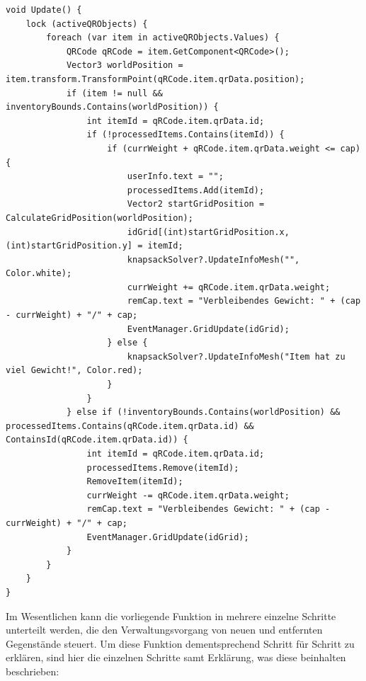 \begin{lstlisting}[style=csharp, caption={Neue / Entfernte Items erkennen}, label=code:controller_updateGrid]
void Update() {
    lock (activeQRObjects) {
        foreach (var item in activeQRObjects.Values) {
            QRCode qRCode = item.GetComponent<QRCode>();
            Vector3 worldPosition = item.transform.TransformPoint(qRCode.item.qrData.position);
            if (item != null && inventoryBounds.Contains(worldPosition)) {
                int itemId = qRCode.item.qrData.id;
                if (!processedItems.Contains(itemId)) {
                    if (currWeight + qRCode.item.qrData.weight <= cap) {
                        userInfo.text = "";
                        processedItems.Add(itemId);
                        Vector2 startGridPosition = CalculateGridPosition(worldPosition);
                        idGrid[(int)startGridPosition.x, (int)startGridPosition.y] = itemId;
                        knapsackSolver?.UpdateInfoMesh("", Color.white);
                        currWeight += qRCode.item.qrData.weight;
                        remCap.text = "Verbleibendes Gewicht: " + (cap - currWeight) + "/" + cap;
                        EventManager.GridUpdate(idGrid);
                    } else {
                        knapsackSolver?.UpdateInfoMesh("Item hat zu viel Gewicht!", Color.red);
                    }
                }
            } else if (!inventoryBounds.Contains(worldPosition) && processedItems.Contains(qRCode.item.qrData.id) && ContainsId(qRCode.item.qrData.id)) {
                int itemId = qRCode.item.qrData.id;
                processedItems.Remove(itemId);
                RemoveItem(itemId);
                currWeight -= qRCode.item.qrData.weight;
                remCap.text = "Verbleibendes Gewicht: " + (cap - currWeight) + "/" + cap;
                EventManager.GridUpdate(idGrid);
            }
        }
    }
}
\end{lstlisting}
Im Wesentlichen kann die vorliegende Funktion in mehrere einzelne Schritte unterteilt werden, die den Verwaltungsvorgang
von neuen und entfernten Gegenstände steuert. Um diese Funktion dementsprechend Schritt für Schritt zu erklären, sind
hier die einzelnen Schritte samt Erklärung, was diese beinhalten beschrieben:
